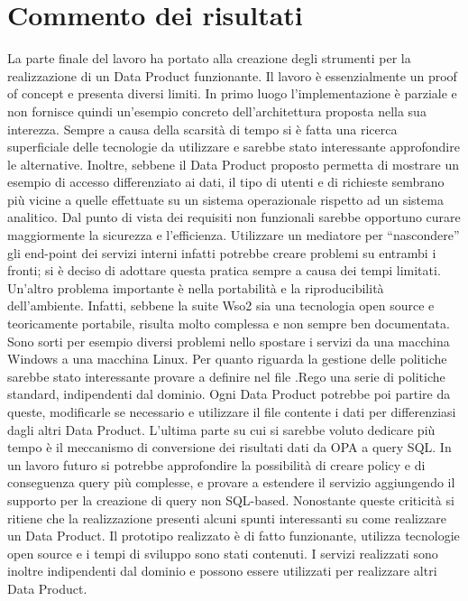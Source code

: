 \documentclass[12pt]{report}
\begin{document}
\section{Commento dei risultati}\label{commento risultati}
La parte finale del lavoro ha portato alla creazione degli strumenti per la realizzazione di un Data Product funzionante.
Il lavoro è essenzialmente un proof of concept e presenta diversi limiti.
In primo luogo l'implementazione è parziale e non fornisce quindi un'esempio concreto dell'architettura proposta nella sua interezza.
Sempre a causa della scarsità di tempo si è fatta una ricerca superficiale delle tecnologie da utilizzare e sarebbe stato interessante approfondire le alternative.
Inoltre, sebbene il Data Product proposto permetta di mostrare un esempio di accesso differenziato ai dati, il tipo di utenti e di richieste sembrano più vicine a quelle effettuate su un sistema operazionale rispetto ad un sistema analitico.
Dal punto di vista dei requisiti non funzionali sarebbe opportuno curare maggiormente la sicurezza e l'efficienza. 
Utilizzare un mediatore per ``nascondere'' gli end-point dei servizi interni infatti potrebbe creare problemi su entrambi i fronti; si è deciso di adottare questa pratica sempre a causa dei tempi limitati.
Un'altro problema importante è nella portabilità e la riproducibilità dell'ambiente. 
Infatti, sebbene la suite Wso2 sia una tecnologia open source e teoricamente portabile, risulta molto complessa e non sempre ben documentata. 
Sono sorti per esempio diversi problemi nello spostare i servizi da una macchina Windows a una macchina Linux.
Per quanto riguarda la gestione delle politiche sarebbe stato interessante provare a definire nel file .Rego una serie di politiche standard, indipendenti dal dominio.
Ogni Data Product potrebbe poi partire da queste, modificarle se necessario e utilizzare il file contente i dati per differenziasi dagli altri Data Product.
L'ultima parte su cui si sarebbe voluto dedicare più tempo è il meccanismo di conversione dei risultati dati da OPA a query SQL.
In un lavoro futuro si potrebbe approfondire la possibilità di creare policy e di conseguenza query più complesse, e provare a estendere il servizio aggiungendo il supporto per la creazione di query non SQL-based.
Nonostante queste criticità si ritiene che la realizzazione presenti alcuni spunti interessanti su come realizzare un Data Product.
Il prototipo realizzato è di fatto funzionante, utilizza tecnologie open source e i tempi di sviluppo sono stati contenuti.
I servizi realizzati sono inoltre indipendenti dal dominio e possono essere utilizzati per realizzare altri Data Product.
\end{document}
